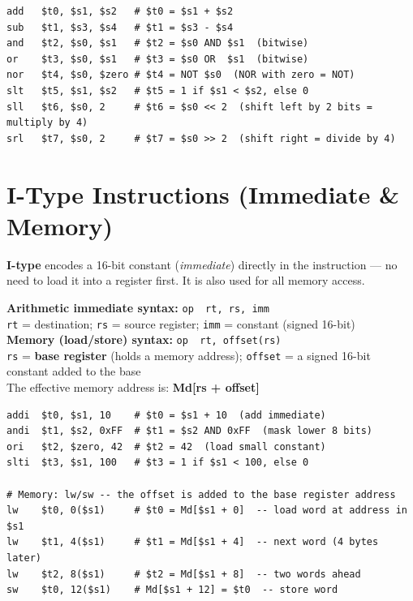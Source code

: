 \documentclass[11pt, letterpaper]{article}
\begin{document}
\begin{lstlisting}[style=mips, caption={R-Type examples}]
add   $t0, $s1, $s2   # $t0 = $s1 + $s2
sub   $t1, $s3, $s4   # $t1 = $s3 - $s4
and   $t2, $s0, $s1   # $t2 = $s0 AND $s1  (bitwise)
or    $t3, $s0, $s1   # $t3 = $s0 OR  $s1  (bitwise)
nor   $t4, $s0, $zero # $t4 = NOT $s0  (NOR with zero = NOT)
slt   $t5, $s1, $s2   # $t5 = 1 if $s1 < $s2, else 0
sll   $t6, $s0, 2     # $t6 = $s0 << 2  (shift left by 2 bits = multiply by 4)
srl   $t7, $s0, 2     # $t7 = $s0 >> 2  (shift right = divide by 4)
\end{lstlisting}

\section*{I-Type Instructions (Immediate \& Memory)}

\textbf{I-type} encodes a 16-bit constant (\emph{immediate}) directly in the instruction --- no need to load it into a register first. It is also used for all memory access.

\begin{tcolorbox}[colback=partbg, colframe=sectionblue, arc=3pt, boxrule=1pt]
\textbf{Arithmetic immediate syntax:} \quad \texttt{op\ \ rt,\ rs,\ imm}\\[2pt]
\texttt{rt} = destination; \quad \texttt{rs} = source register; \quad \texttt{imm} = constant (signed 16-bit)\\[6pt]
\textbf{Memory (load/store) syntax:} \quad \texttt{op\ \ rt,\ offset(rs)}\\[2pt]
\texttt{rs} = \textbf{base register} (holds a memory address); \quad \texttt{offset} = a signed 16-bit constant added to the base\\
The effective memory address is: \textbf{Md[rs + offset]}
\end{tcolorbox}

\begin{lstlisting}[style=mips, caption={I-Type examples}]
addi  $t0, $s1, 10    # $t0 = $s1 + 10  (add immediate)
andi  $t1, $s2, 0xFF  # $t1 = $s2 AND 0xFF  (mask lower 8 bits)
ori   $t2, $zero, 42  # $t2 = 42  (load small constant)
slti  $t3, $s1, 100   # $t3 = 1 if $s1 < 100, else 0

# Memory: lw/sw -- the offset is added to the base register address
lw    $t0, 0($s1)     # $t0 = Md[$s1 + 0]  -- load word at address in $s1
lw    $t1, 4($s1)     # $t1 = Md[$s1 + 4]  -- next word (4 bytes later)
lw    $t2, 8($s1)     # $t2 = Md[$s1 + 8]  -- two words ahead
sw    $t0, 12($s1)    # Md[$s1 + 12] = $t0  -- store word
\end{lstlisting}
\end{document}

